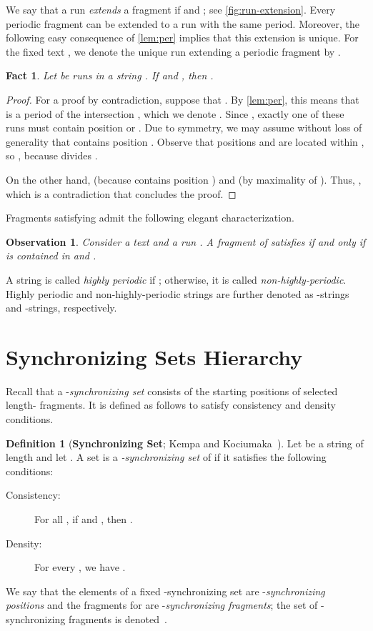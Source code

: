 \documentclass[a4paper]{article}
\newtheorem{fact}[theorem]{Fact}
\newtheorem{observation}[theorem]{Observation}
\theoremstyle{definition}
\newtheorem{definition}[theorem]{Definition}
\theoremstyle{remark}
\begin{document}
We say that a run  \emph{extends} a fragment  if  and ; see \cref{fig:run-extension}.
Every periodic fragment can be extended to a run with the same period. Moreover, the following easy consequence of \cref{lem:per} implies that this extension is unique. For the fixed text , we denote the unique run extending a periodic fragment  by .
\begin{fact}\label{fct:uni}
Let  be runs in a string .
If  and ,
then .
\end{fact}
\begin{proof}
For a proof by contradiction, suppose that  .
By \cref{lem:per}, this means that  is a period of the intersection , which we denote .
Since , exactly one of these runs must contain position  or .
Due to symmetry, we may assume without loss of generality that  contains position .
Observe that positions  and  are located within , so ,
because  divides .

On the other hand,  (because  contains position ) and  (by maximality of ).
Thus, , which is a contradiction that concludes the proof.
\end{proof}

Fragments  satisfying  admit the following elegant characterization.

\begin{observation}\label{obs:char}
Consider a text  and a run .
A fragment  of  satisfies  if and only if  is contained in 
and .
\end{observation}

A string  is called \emph{highly periodic} if ; otherwise, it is called \emph{non-highly-periodic}.
Highly periodic and non-highly-periodic strings are further denoted as -strings and -strings, respectively.

\section{Synchronizing Sets Hierarchy}\label{chp:lce}
Recall that a -\emph{synchronizing set} consists of the starting positions of selected length- fragments.
It is defined as follows to satisfy consistency and density conditions.

\begin{definition}[\textbf{Synchronizing Set}; Kempa and Kociumaka~\cite{Kempa2019}]
  Let  be a string of length  and let .
  A set  is a \emph{-synchronizing set} of  if it satisfies the following conditions:
  \begin{description}
\item[Consistency:] For all , if  and , then .
\item[Density:]
For every , we have .
\end{description}
We say that the elements of a fixed -synchronizing set  are -\emph{synchronizing positions} and the fragments  for  are -\emph{synchronizing fragments}; the set of -synchronizing fragments is denoted~.
\end{definition}
\end{document}
